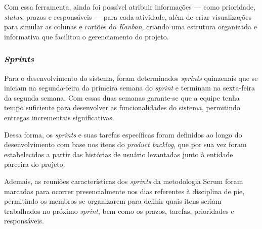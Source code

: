 Com essa ferramenta, ainda foi possível atribuir informações --- como prioridade, \textit{status}, prazos e responsáveis --- para cada atividade, além de criar visualizações para simular as colunas e cartões do \emph{Kanban}, criando uma estrutura organizada e informativa que facilitou o gerenciamento do projeto.

\subsubsection{\emph{Sprints}}

Para o desenvolvimento do sistema, foram determinados \textit{sprints} quinzenais que se iniciam na segunda-feira da primeira semana do \textit{sprint} e terminam na sexta-feira da segunda semana. Com essas duas semanas garante-se que a equipe tenha tempo suficiente para desenvolver as funcionalidades do sistema, permitindo entregas incrementais significativas.

Dessa forma, os \textit{sprints} e suas tarefas específicas foram definidos ao longo do desenvolvimento com base nos itens do \textit{product backlog}, que por sua vez foram estabelecidos a partir das histórias de usuário levantadas junto à entidade parceira do projeto.

Ademais, as reuniões características dos \textit{sprints} da metodologia Scrum foram marcadas para ocorrer presencialmente nos dias referentes à disciplina de \gls{pie}, permitindo os membros se organizarem para definir quais itens seriam trabalhados no próximo \textit{sprint}, bem como os prazos, tarefas, prioridades e responsáveis. 
